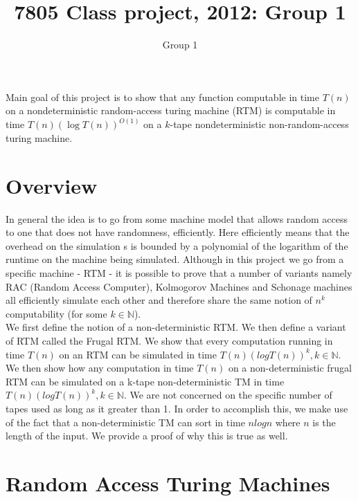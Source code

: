 \documentclass[english]{article}
\theoremstyle{plain}
\theoremstyle{definition}
\theoremstyle{plain}
\begin{document}
\title{7805 Class project, 2012: Group 1}
\author{Group 1}
\maketitle

Main goal of this project is to show that any function computable in time $T(n)$ on a nondeterministic
random-access turing machine (RTM) is computable in time $T(n)(\log T(n))^{O(1)}$
on a $k$-tape nondeterministic non-random-access turing machine. 

\section{Overview}
In general the idea is to go from some machine model that allows random access to one that does not have randomness, efficiently. Here efficiently means that the overhead on the simulation s is bounded by a polynomial of the logarithm of the runtime on the machine being simulated. Although in this project we go from a specific machine - RTM - it is possible to prove that a number of variants namely RAC (Random Access Computer), Kolmogorov Machines and Schonage machines all efficiently simulate each other and therefore share the same notion of $n^k$ computability (for some $k \in \mathbb{N}$). \\

We first define the notion of a non-deterministic RTM. We then define a variant of RTM called the Frugal RTM. We show that every computation running in time $T(n)$ on an RTM can be simulated in time $T(n) (log T(n))^k, k \in \mathbb{N}$. We then show how any computation in time $T(n)$ on a non-deterministic frugal RTM can be simulated on a  k-tape non-deterministic TM in time $T(n) (log T(n))^k, k \in \mathbb{N}$. We are not concerned on the specific number of tapes used as long as it greater than 1. In order to accomplish this, we make use of the fact that a non-deterministic TM can sort in time $n logn$ where $n$ is the length of the input. We provide a proof of why this is true as well.

\section{Random Access Turing Machines}	
\end{document}
